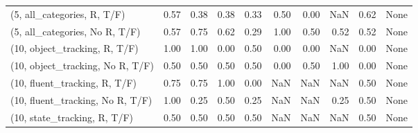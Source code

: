 \begin{table*}[h!]
\begin{adjustbox}{width=2\columnwidth,center}
\begin{tabular}{lrrr|rrr|rrr}
(5, all\_categories, R, T/F)          &                      0.57 &                  0.38 &                      0.38 &                          0.33 &                      0.50 &                          0.00 &                                    NaN &                               0.62 &                                  None \\
(5, all\_categories, No R, T/F)       &                      0.57 &                  0.75 &                      0.62 &                          0.29 &                      1.00 &                          0.50 &                                   0.52 &                               0.52 &                                  None \\



\midrule
(10, object\_tracking, R, T/F)         &                      1.00 &                  1.00 &                      0.00 &                          0.50 &                      0.00 &                          0.00 &                                    NaN &                               0.00 &                                  None \\
(10, object\_tracking, No R, T/F)      &                      0.50 &                  0.50 &                      0.50 &                          0.50 &                      0.00 &                          0.50 &                                   1.00 &                               0.00 &                                  None \\
(10, fluent\_tracking, R, T/F)         &                      0.75 &                  0.75 &                      1.00 &                          0.00 &                       NaN &                           NaN &                                    NaN &                               0.50 &                                  None \\
(10, fluent\_tracking, No R, T/F)      &                      1.00 &                  0.25 &                      0.50 &                          0.25 &                       NaN &                           NaN &                                   0.25 &                               0.50 &                                  None \\
(10, state\_tracking, R, T/F)          &                      0.50 &                  0.50 &                      0.50 &                          0.50 &                       NaN &                           NaN &                                    NaN &                               0.50 &                                  None \\

\end{tabular}
\end{adjustbox}
\end{table*}
